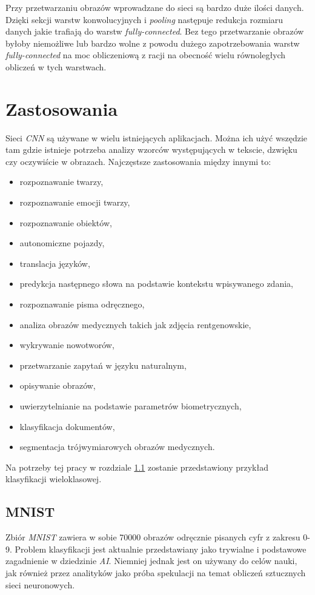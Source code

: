 \documentclass[a4paper,12pt,oneside]{book} %
\begin{document}
Przy przetwarzaniu obrazów wprowadzane do sieci są bardzo duże ilości danych. Dzięki sekcji warstw konwolucyjnych i \emph{pooling} następuje redukcja rozmiaru danych jakie trafiają do warstw \emph{fully-connected}. Bez tego przetwarzanie obrazów byłoby niemożliwe lub bardzo wolne z powodu dużego zapotrzebowania warstw \emph{fully-connected} na moc obliczeniową z racji na obecność wielu równoległych obliczeń w tych warstwach\cite{8308186}. 

\section{Zastosowania}

Sieci \emph{CNN} są używane w wielu istniejących aplikacjach. Można ich użyć wszędzie tam gdzie istnieje potrzeba analizy wzorców występujących w tekscie, dzwięku czy oczywiście w obrazach. Najczęstsze zastosowania między innymi to:
\begin{itemize}
	\item rozpoznawanie twarzy,
	\item rozpoznawanie emocji twarzy,
	\item rozpoznawanie obiektów,
	\item autonomiczne pojazdy,
	\item translacja języków,
	\item predykcja następnego słowa na podstawie kontekstu wpisywanego zdania,
	\item rozpoznawanie pisma odręcznego,
	\item analiza obrazów medycznych takich jak zdjęcia rentgenowskie,
	\item wykrywanie nowotworów,
	\item przetwarzanie zapytań w języku naturalnym,
	\item opisywanie obrazów,
	\item uwierzytelnianie na podstawie parametrów biometrycznych,
	\item klasyfikacja dokumentów,
	\item segmentacja trójwymiarowych obrazów medycznych\cite{cnnapps}.
\end{itemize}

Na potrzeby tej pracy w rozdziale \ref{mnist} zostanie przedstawiony przykład klasyfikacji wieloklasowej.

\subsection{MNIST}
\label{mnist}
Zbiór \emph{MNIST} zawiera w sobie 70000 obrazów odręcznie pisanych cyfr z zakresu 0-9. Problem klasyfikacji jest aktualnie przedstawiany jako trywialne i podstawowe zagadnienie w dziedzinie \emph{AI}. Niemniej jednak jest on używany do celów nauki, jak również przez analityków jako próba spekulacji na temat obliczeń sztucznych sieci neuronowych\cite{9388351}. 
\end{document}
